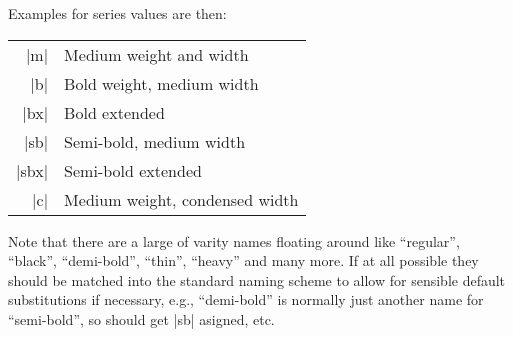 \documentclass{ltxguide}[1995/11/28]
\begin{document}
\newpage

Examples for series values are then:
\begin{center}
\begin{minipage}{.7\linewidth}
   \begin{tabular}{rl}
      |m|    & Medium weight and width  \\
      |b|    & Bold weight, medium width  \\
      |bx|   & Bold extended \\
      |sb|   & Semi-bold, medium width\\
      |sbx|   & Semi-bold extended\\
      |c|    & Medium weight, condensed width
   \end{tabular}
\end{minipage}
\end{center}
Note that there are a large of varity names floating around like
``regular'', ``black'', ``demi-bold'', ``thin'', ``heavy'' and many
more. If at all possible they should be matched into the standard
naming scheme to allow for sensible default substitutions if
necessary, e.g., ``demi-bold'' is normally just another name for
``semi-bold'', so should get |sb| asigned, etc.
\end{document}

